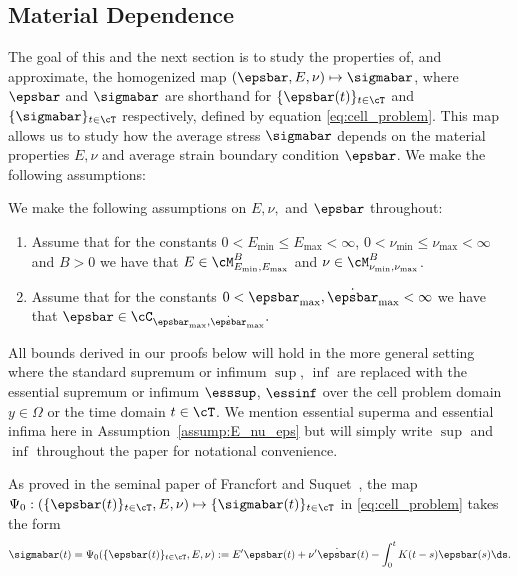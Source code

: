 \documentclass[letterpaper,11pt]{article}
\begin{document}
\subsection{Material Dependence}\label{subsec:mat_dep}
The goal of this and the next section is to study the properties of,
and approximate, the homogenized map $(\epsbar, E, \nu)\mapsto \sigmabar$, where $\epsbar$ and $\sigmabar$ are shorthand for $\{\epsbar(t)\}_{t\in\cT}$ and $\{\sigmabar\}_{t\in \cT}$ respectively, defined by equation \eqref{eq:cell_problem}. This map allows us to study how the average stress $\sigmabar$ depends on the material properties $E, \nu$ and average strain boundary condition $\epsbar$. We make the following assumptions: 
\begin{assumptions}\label{assump:E_nu_eps}
    We make the following assumptions on $E, \nu,$ and $\epsbar$ throughout:
    \begin{enumerate}
        \item  Assume that for the constants $0 < E_{\min} \leq E_{\max} < \infty$, $0 < \nu_{\min} \leq \nu_{\max} < \infty$ and $B>0$ we have that $E \in \cM_{E_{\min}, E_{\max}}^B$ and $\nu \in \cM_{\nu_{\min}, \nu_{\max}}^B$.
        \item  Assume that for the constants $0 < \epsbar_{\max}, \dot{\epsbar}_{\max} < \infty$ we have that $\epsbar \in \cC_{\epsbar_{\max}, \dot{\epsbar}_{\max}}.$ 
    \end{enumerate}
\end{assumptions}



\begin{remark}
    All bounds derived in our proofs below will hold in the more general setting where the standard supremum or infimum $\sup$, $\inf$ are replaced with the essential supremum or infimum $\esssup$, $\essinf$ over the cell problem domain $y \in \Omega$ or the time domain $t \in \cT$. We mention essential superma and essential infima here in Assumption~\ref{assump:E_nu_eps} but will simply write $\sup$ and $\inf$ throughout the paper for notational convenience.
\end{remark}

As proved in the seminal paper of Francfort and Suquet~\cite{francfort1986homogenization}, the map $\Psi_0: (\{\epsbar(t)\}_{t\in \cT}, E, \nu) \mapsto \{\sigmabar(t)\}_{t\in\cT}$ in \eqref{eq:cell_problem} takes the form
\begin{equation}\label{eqn:kernelform}
\sigmabar(t) = \Psi_0(\{\epsbar(t)\}_{t\in \cT}, E, \nu) := E'\epsbar(t) + \nu' \dot{\epsbar}(t) - \int_0^t K(t-s) \epsbar(s) \ds.
\end{equation}
\end{document}
